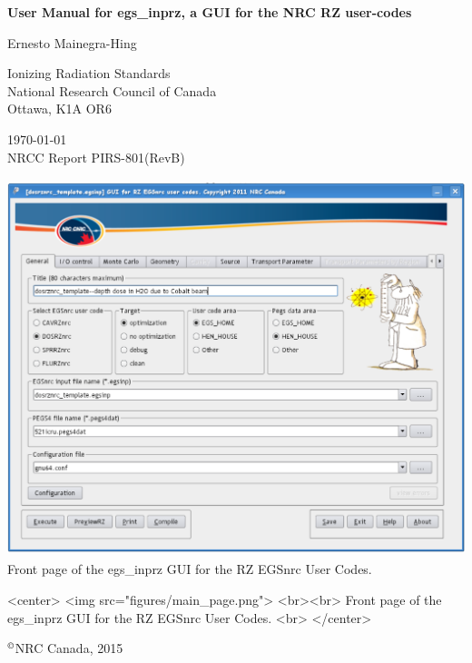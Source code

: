 \documentclass[12pt,twoside]{article}   %
\newcommand{\supcopyright}{$^{\copyright}$}       %
\begin{document}
\begin{center}
{\sffamily \bfseries {\Huge User Manual for egs\_inprz, a GUI for the NRC RZ user-codes}
\vspace{5mm}\\}
\begin{Large}
Ernesto Mainegra-Hing \\
\end{Large}
Ionizing Radiation Standards\\
National Research Council of Canada
\\Ottawa, K1A OR6\\
\vspace{10mm}

\today \vspace{3mm}\\
\hfill NRCC Report {\sf PIRS-801}(RevB) \vspace*{10mm}\\

\begin{latexonly}
\begin{center}
\includegraphics[height=11cm]{figures/main_page}
\vspace{5mm}
\\Front page of the egs\_inprz GUI for the RZ EGSnrc User Codes.
\vspace{10mm}\\
\end{center}
\end{latexonly}
\begin{htmlonly}
\begin{rawhtml}
<center>
<img src="figures/main_page.png">
<br><br>
Front page of the egs\_inprz GUI for the RZ EGSnrc User Codes.
<br>
</center>
\end{rawhtml}
\end{htmlonly}

\supcopyright NRC Canada, 2015

\end{center}
\newpage   %
\mbox{}
\end{document}
